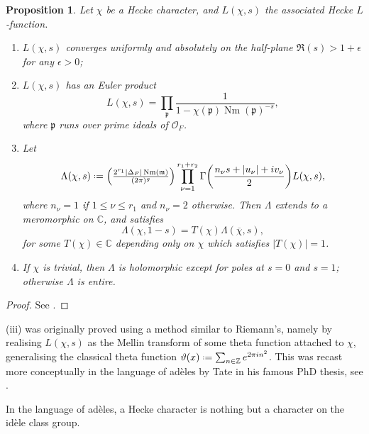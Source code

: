 \documentclass[11pt,a4paper]{article}
\let\mf\mathfrak
\newcommand{\Z}{\mathbb{Z}}
\newcommand{\C}{\mathbb{C}}
\renewcommand{\O}{\mathscr{O}}
\newcommand*{\defeq}{\mathrel{\vcenter{\baselineskip0.5ex \lineskiplimit0pt
      \hbox{\scriptsize.}\hbox{\scriptsize.}}}%
  =}
\renewcommand{\bar}{\overline}
\renewcommand{\theta}{\vartheta}
\DeclareMathOperator{\Nm}{Nm}
\theoremstyle{plain}
\newtheorem{prop}[thm]{Proposition}
\theoremstyle{definition}
\theoremstyle{remark}
\numberwithin{equation}{section}
\begin{document}
 \begin{prop}
   Let $\chi$ be a Hecke character, and $L(\chi,s)$ the associated Hecke $L$-function.
\begin{enumerate}
\item $L(\chi,s)$ converges uniformly and
  absolutely on the half-plane $\Re(s)> 1 + \epsilon$ for any $\epsilon > 0$; 
\item $L(\chi,s)$ has an Euler product
  \begin{equation}
    \label{eq:21}
    L(\chi,s) = \prod_{\mf p }\frac{1}{1 - \chi(\mf p)\Nm(\mf p)^{-s}},
  \end{equation}
  where $\mf p$ runs over prime ideals of $\O_{F}$.
\item Let
  \begin{equation}
    \label{eq:Hecke-fn-eq}
    \Lambda(\chi,s ) \defeq \mqty(\frac{2^{r_{1}}|\Delta_{F}|\Nm(\mf m)}{(2\pi)^{g}})
    \prod_{\nu =1}^{r_{1}+r_{2}}\Gamma\qty(\frac{n_{\nu}s +|u_{\nu}| + i v_{\nu}}{2})L(\chi,s),
  \end{equation}
  where $n_{\nu} = 1$ if $1 \le \nu \le r_{1}$ and $n_{\nu}= 2$ otherwise. Then
  $\Lambda$ extends to a meromorphic on $\C$, and satisfies
  \begin{equation}
    \label{eq:23}
    \Lambda(\chi,1-s) = T(\chi)\Lambda(\bar \chi,s),
  \end{equation}
  for some $T(\chi) \in \C$ depending only on $\chi$ which satisfies $|T(\chi)| =
  1$.
\item If $\chi$ is trivial, then $\Lambda$ is holomorphic except for poles at
  $s=0$ and $s=1$; otherwise $\Lambda$ is entire. 
\end{enumerate}
\end{prop}
\begin{proof}
  See \cite[\S 3.3]{miyake1989}.
\end{proof}
 (iii) was originally proved using a
  method similar to Riemann's, namely by realising $L(\chi,s)$ as the
  Mellin transform of some theta function attached to $\chi$,
  generalising the classical theta function
  $\theta(x) \defeq \sum_{n \in \Z}e^{2\pi i n^{2}}$. This was recast more
  conceptually in the language of adèles by Tate in his famous PhD
  thesis, see \cite[Ch.XV]{cassels1967}.

  In the language of adèles, a Hecke character is nothing but a
  character on the idèle class group.

  
\end{document}
